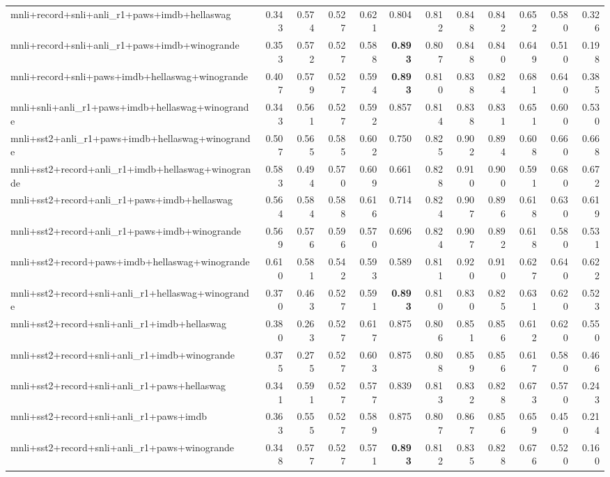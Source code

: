 \begin{table}[t]
\begin{tabular}{lrrrrrrrrrrr}
    mnli+record+snli+anli\_r1+paws+imdb+hellaswag & 0.343 & 0.574 & 0.527 & 0.621 & 0.804 & 0.812 & 0.848 & 0.842 & 0.652 & 0.580 & 0.326 \\
    mnli+record+snli+anli\_r1+paws+imdb+winogrande & 0.353 & 0.572 & 0.527 & 0.588 & \textbf{0.893} & 0.807 & 0.848 & 0.840 & 0.649 & 0.510 & 0.198 \\
    mnli+record+snli+paws+imdb+hellaswag+winogrande & 0.407 & 0.579 & 0.527 & 0.594 & \textbf{0.893} & 0.810 & 0.838 & 0.824 & 0.681 & 0.640 & 0.385 \\
    mnli+snli+anli\_r1+paws+imdb+hellaswag+winogrande & 0.343 & 0.561 & 0.527 & 0.592 & 0.857 & 0.814 & 0.838 & 0.831 & 0.651 & 0.600 & 0.530 \\
    mnli+sst2+anli\_r1+paws+imdb+hellaswag+winogrande & 0.507 & 0.565 & 0.585 & 0.602 & 0.750 & 0.825 & 0.902 & 0.894 & 0.608 & 0.660 & 0.668 \\
    mnli+sst2+record+anli\_r1+imdb+hellaswag+winogrande & 0.583 & 0.494 & 0.570 & 0.609 & 0.661 & 0.828 & 0.910 & 0.900 & 0.591 & 0.680 & 0.672 \\
    mnli+sst2+record+anli\_r1+paws+imdb+hellaswag & 0.564 & 0.584 & 0.588 & 0.616 & 0.714 & 0.824 & 0.907 & 0.896 & 0.618 & 0.630 & 0.619 \\
    mnli+sst2+record+anli\_r1+paws+imdb+winogrande & 0.569 & 0.576 & 0.596 & 0.570 & 0.696 & 0.824 & 0.907 & 0.892 & 0.618 & 0.580 & 0.531 \\
    mnli+sst2+record+paws+imdb+hellaswag+winogrande & 0.610 & 0.581 & 0.542 & 0.593 & 0.589 & 0.811 & 0.920 & 0.910 & 0.627 & 0.640 & 0.622 \\
    mnli+sst2+record+snli+anli\_r1+hellaswag+winogrande & 0.370 & 0.463 & 0.527 & 0.591 & \textbf{0.893} & 0.810 & 0.830 & 0.825 & 0.631 & 0.620 & 0.523 \\
    mnli+sst2+record+snli+anli\_r1+imdb+hellaswag & 0.380 & 0.263 & 0.527 & 0.617 & 0.875 & 0.806 & 0.851 & 0.856 & 0.612 & 0.620 & 0.550 \\
    mnli+sst2+record+snli+anli\_r1+imdb+winogrande & 0.375 & 0.275 & 0.527 & 0.603 & 0.875 & 0.808 & 0.859 & 0.856 & 0.617 & 0.580 & 0.466 \\
    mnli+sst2+record+snli+anli\_r1+paws+hellaswag & 0.341 & 0.591 & 0.527 & 0.577 & 0.839 & 0.813 & 0.832 & 0.828 & 0.673 & 0.570 & 0.243 \\
    mnli+sst2+record+snli+anli\_r1+paws+imdb & 0.363 & 0.555 & 0.527 & 0.589 & 0.875 & 0.807 & 0.867 & 0.856 & 0.659 & 0.450 & 0.214 \\
    mnli+sst2+record+snli+anli\_r1+paws+winogrande & 0.348 & 0.577 & 0.527 & 0.571 & \textbf{0.893} & 0.812 & 0.835 & 0.828 & 0.676 & 0.520 & 0.160 \\

\end{tabular}
\end{table}
